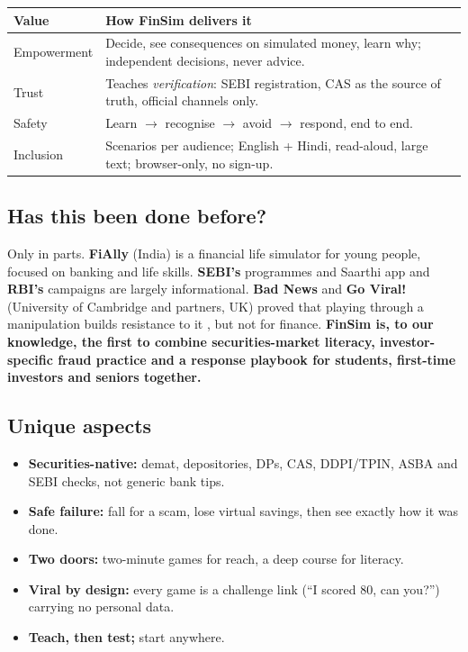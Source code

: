 \documentclass[10pt,twocolumn]{article}
\newenvironment{inlinetable}{\par\smallskip\noindent\begin{minipage}{\columnwidth}\centering\footnotesize}{\end{minipage}\par\smallskip}
\begin{document}
\begin{inlinetable}
\label{tab:values}
\begin{tabularx}{\columnwidth}{@{}p{1.5cm}L@{}}
\toprule
\textbf{Value} & \textbf{How FinSim delivers it} \\
\midrule
Empowerment & Decide, see consequences on simulated money, learn why; independent decisions, never advice. \\
Trust       & Teaches \emph{verification}: SEBI registration, CAS as the source of truth, official channels only. \\
Safety      & Learn $\rightarrow$ recognise $\rightarrow$ avoid $\rightarrow$ respond, end to end. \\
Inclusion   & Scenarios per audience; English + Hindi, read-aloud, large text; browser-only, no sign-up. \\
\bottomrule
\end{tabularx}
\end{inlinetable}

\subsection{Has this been done before?}
Only in parts. \textbf{FiAlly} (India) is a financial life simulator for young people, focused on banking and life skills.
\textbf{SEBI's} programmes and Saarthi app and \textbf{RBI's} campaigns are largely informational. \textbf{Bad News} and
\textbf{Go Viral!} (University of Cambridge and partners, UK) proved that playing through a manipulation builds resistance to it
\cite{roozenbeek,basol}, but not for finance. \textbf{FinSim is, to our knowledge, the first to combine securities-market
literacy, investor-specific fraud practice and a response playbook for students, first-time investors and seniors together.}

\subsection{Unique aspects}
\begin{itemize}
  \item \textbf{Securities-native:} demat, depositories, DPs, CAS, DDPI/TPIN, ASBA and SEBI checks, not generic bank tips.
  \item \textbf{Safe failure:} fall for a scam, lose virtual savings, then see exactly how it was done.
  \item \textbf{Two doors:} two-minute games for reach, a deep course for literacy.
  \item \textbf{Viral by design:} every game is a challenge link (``I scored 80, can you?'') carrying no personal data.
  \item \textbf{Teach, then test;} start anywhere.
\end{itemize}
\end{document}
